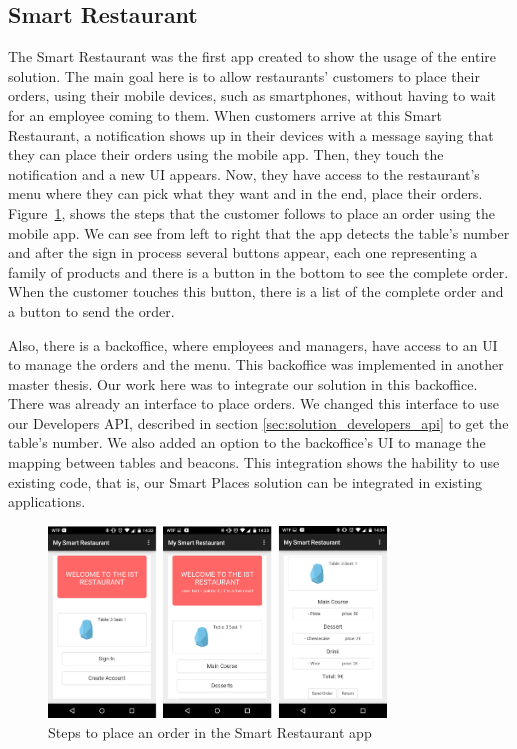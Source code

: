 \subsection{Smart Restaurant}
\label{sub:solution_smart_restaurant}
The Smart Restaurant was the first app created to show the usage of the entire solution.
The main goal here is to allow restaurants' customers to place their orders, using their mobile devices, such as smartphones, without having to wait for an employee coming to them.
When customers arrive at this Smart Restaurant, a notification shows up in their devices with a message saying that they can place their orders using the mobile app.
Then, they touch the notification and a new \gls{UI} appears.
Now, they have access to the restaurant's menu where they can pick what they want and in the end, place their orders.
Figure~\ref{fig:smart_restaurant_app}, shows the steps that the customer follows to place an order using the mobile app. We can see from left to right that the app detects the table's number and after the sign in process several buttons appear, each one representing a family of products and there is a button in the bottom to see the complete order.
When the customer touches this button, there is a list of the complete order and a button to send the order.

Also, there is a backoffice, where employees and managers, have access to an \gls{UI} to manage the orders and the menu.
This backoffice was implemented in another master thesis\cite{SLOC}.
Our work here was to integrate our solution in this backoffice.
There was already an interface to place orders.
We changed this interface to use our Developers \gls{API}, described in section \ref{sec:solution_developers_api} to get the table's number.
We also added an option to the backoffice's \gls{UI} to manage the mapping between tables and beacons.
This integration shows the hability to use existing code, that is, our Smart Places solution can be integrated in existing applications.

\begin{figure}[!ht]
  \centering
    \includegraphics[width=0.8\textwidth, keepaspectratio]{images/screenshots/smart_restaurant_app}
    \caption[Smart Restaurant]{Steps to place an order in the Smart Restaurant app}
    \label{fig:smart_restaurant_app}
\end{figure}

